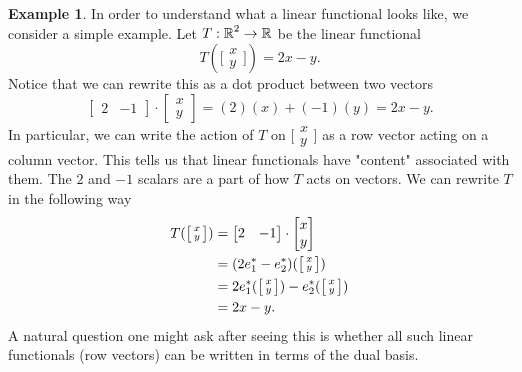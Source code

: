 \documentclass[12pt]{article}
\theoremstyle{definition}
\newtheorem{example}{Example}[section]
\theoremstyle{plain}
\numberwithin{equation}{section}
\theoremstyle{definition}
\begin{document}
\begin{example} \label{forms_as_row_vecs}
In order to understand what a linear functional looks like, we consider a simple example. Let $ T : \operatorname{\mathbb{R}}^2 \to \operatorname{\mathbb{R}} $ be the linear functional
\[ T( \big[\begin{smallmatrix} x \\ y\end{smallmatrix}\big]) = 2x - y. \]
Notice that we can rewrite this as a dot product between two vectors
\[ \begin{bmatrix}
	2 & -1
\end{bmatrix} \cdot 
\begin{bmatrix}
	x\\
	y
\end{bmatrix} = (2)(x) + (-1)(y) = 2x - y.
\]
In particular, we can write the action of $ T $ on $ \big[ \begin{smallmatrix} x\\ y \end{smallmatrix} \big] $ as a row vector acting on a column vector. This tells us that linear functionals have "content" associated with them. The $ 2 $ and $ -1 $ scalars are a part of how $ T $ acts on vectors. We can rewrite $ T $ in the following way
\begin{align*}
 	T( \big[\begin{smallmatrix} x \\ y\end{smallmatrix}\big]) &= \begin{bmatrix}
	2 & -1
\end{bmatrix} \cdot 
\begin{bmatrix}
	x\\
	y
\end{bmatrix}\\
	&=
	( 2 e_1^{*} - e_2^{*} ) (\big[\begin{smallmatrix} x \\ y \end{smallmatrix}\big])\\
	&= 2 e_1^{*}(\big[\begin{smallmatrix} x \\ y \end{smallmatrix}\big]) - e_2^{*}(\big[\begin{smallmatrix} x \\ y \end{smallmatrix}\big])\\
	&= 2x - y.
\end{align*}
A natural question one might ask after seeing this is whether all such linear functionals (row vectors) can be written in terms of the dual basis.
\end{example}
\end{document}
